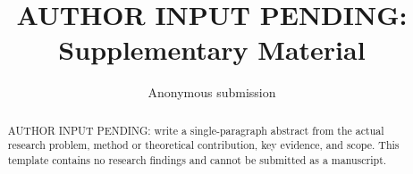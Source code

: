 \documentclass[letterpaper]{article}
\title{AUTHOR INPUT PENDING: Supplementary Material}\author{Anonymous submission}\affiliations{Anonymous submission}
\begin{document}
\maketitle
\begin{abstract}
AUTHOR INPUT PENDING: write a single-paragraph abstract from the actual research problem,
method or theoretical contribution, key evidence, and scope. This template contains
no research findings and cannot be submitted as a manuscript.
\end{abstract}


\clearpage
\end{document}
